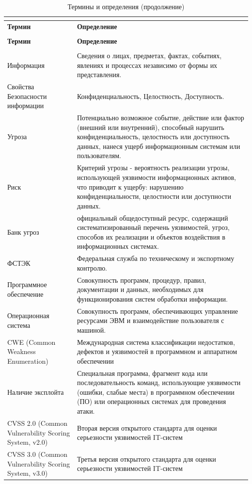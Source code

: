 \documentclass[areasetadvanced]{scrartcl}
\begin{document}
\begin{center}
\renewcommand{\arraystretch}{0.75}
\setlength{\tabcolsep}{3pt}
\begin{longtable}{>{\raggedright\arraybackslash}p{3.5cm}>{\raggedright\arraybackslash}p{9.5cm}}
\caption{Термины и определения} \\
\label{tab:terms} \\
\toprule
\textbf{Термин} & \textbf{Определение} \\
\midrule
\endfirsthead
\caption[]{Термины и определения (продолжение)} \\
\toprule
\textbf{Термин} & \textbf{Определение} \\
\midrule
\endhead
\midrule
\multicolumn{2}{r}{Продолжение на следующей странице} \\
\endfoot
\bottomrule
\endlastfoot
Информация & Сведения о лицах, предметах, фактах, событиях, явлениях и процессах независимо от формы их представления. \\
\hline
Свойства Безопасности информации &  Конфиденциальность, Целостность, Доступность. \\
\hline
Угроза & Потенциально возможное событие, действие или фактор (внешний или внутренний), способный нарушить конфиденциальность, целостность или доступность данных, нанеся ущерб информационным системам или пользователям. \\
\hline
Риск & Критерий угрозы - вероятность реализации угрозы, использующей уязвимости информационных активов, что приводит к ущербу: нарушению конфиденциальности, целостности или доступности данных. \\
\hline
Банк угроз & официальный общедоступный ресурс, содержащий систематизированный перечень уязвимостей, угроз, способов их реализации и объектов воздействия в информационных системах. \\
\hline
ФСТЭК & Федеральная служба по техническому и экспортному контролю. \\
\hline
Программное обеспечение & Совокупность программ, процедур, правил, документации и данных, необходимых для функционирования систем обработки информации. \\
\hline
Операционная система & Совокупность программ, обеспечивающих управление ресурсами ЭВМ и взаимодействие пользователя с машиной. \\
\hline
CWE (Common Weakness Enumeration) & Международная система классификации недостатков, дефектов и уязвимостей в программном и аппаратном обеспечении \\
\hline
Наличие эксплойта & Специальная программа, фрагмент кода или последовательность команд, использующие уязвимости (ошибки, слабые места) в программном обеспечении (ПО) или операционных системах для проведения атаки.\\
\hline
CVSS 2.0 (Common Vulnerability Scoring System, v2.0) & Вторая версия открытого стандарта для оценки серьезности уязвимостей IT-систем \\
\hline
CVSS 3.0 (Common Vulnerability Scoring System, v3.0) & Третья версия открытого стандарта для оценки серьезности уязвимостей IT-систем \\
\end{longtable}
\end{center}
\end{document}

